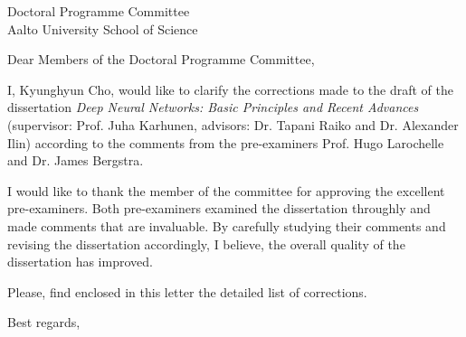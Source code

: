 \documentclass{myletter}
\begin{document}
\begin{letter}{Doctoral Programme Committee \\ Aalto
    University School of Science}

    \opening{Dear Members of the Doctoral Programme Committee,}

    I, Kyunghyun Cho, would like to clarify the corrections made
    to the draft of the dissertation \textit{Deep Neural
    Networks: Basic Principles and Recent Advances} (supervisor:
    Prof. Juha Karhunen, advisors: Dr. Tapani Raiko and Dr.
    Alexander Ilin) according to the comments from the
    pre-examiners Prof. Hugo Larochelle and Dr. James Bergstra. 

    I would like to thank the member of the committee for
    approving the excellent pre-examiners. Both pre-examiners
    examined the dissertation throughly and made comments that
    are invaluable. By carefully studying their comments and
    revising the dissertation accordingly, I believe, the
    overall quality of the dissertation has improved.

    Please, find enclosed in this letter the detailed list of
    corrections.

    \closing{Best regards,}


\end{letter}
\end{document}
